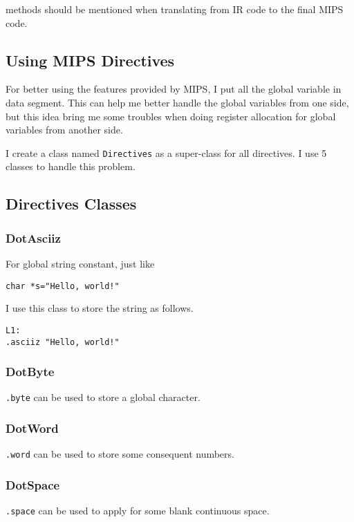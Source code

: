 \documentclass[journal]{IEEEtran}
\begin{document}
 methods should be mentioned when translating from IR code to the final MIPS code. 

\subsection{Using MIPS Directives}

For better using the features provided by MIPS, I put all the global variable in data segment. This can help me better handle the global variables from one side, but this idea bring me some troubles when doing register allocation for global variables from another side.

I create a class named \texttt{Directives} as a super-class for all directives. I use 5 classes to handle this problem.

\subsection*{Directives Classes}

\subsubsection{DotAsciiz}
For global string constant, just like 
\begin{center}
\texttt{char *s="Hello, world!"}
\end{center}
 I use this class to store the string as follows.
\begin{center}
\texttt{L1: \ \  \ \ \ \ \ \  \  \ \ \ \ \ \  \   \  \ \ \ \ \ \  \ \  \ } \\
\texttt{.asciiz "Hello, world!"} \\
\end{center}

\subsubsection{DotByte}
\texttt{.byte} can be used to store a global character.

\subsubsection{DotWord}
\texttt{.word} can be used to store some consequent numbers.

\subsubsection{DotSpace}
\texttt{.space} can be used to apply for some blank continuous space.
\end{document}
